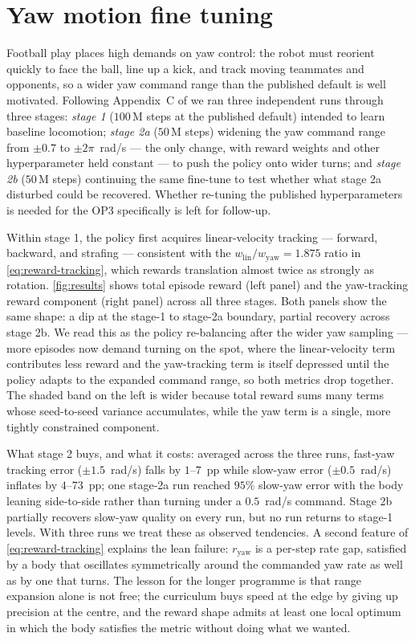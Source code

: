 \section{Yaw motion fine tuning}

Football play places high demands on yaw control: the robot must reorient
quickly to face the ball, line up a kick, and track moving teammates and
opponents, so a wider yaw command range than the published default is well
motivated. Following Appendix~C of
\citet{Zakka2025-demonstrating-mujoco-playground} we ran three independent runs
through three stages: \textit{stage 1} ($100$\,M steps at the published default)
intended to learn baseline locomotion; \textit{stage 2a} ($50$\,M steps)
widening the yaw command range from $\pm 0.7$ to $\pm 2\pi$~rad/s — the only
change, with reward weights and other hyperparameter held constant — to
push the policy onto wider turns; and \textit{stage 2b} ($50$\,M steps)
continuing the same fine-tune to test whether what stage 2a disturbed could be
recovered. Whether re-tuning the published hyperparameters is needed for the OP3
specifically is left for follow-up.

Within stage 1, the policy first acquires linear-velocity tracking — forward, backward, and strafing — consistent with the $w_{\text{lin}}/w_{\text{yaw}} = 1.875$ ratio in \autoref{eq:reward-tracking}, which rewards translation almost twice as strongly as rotation. \autoref{fig:results} shows total episode reward (left panel) and the yaw-tracking reward component (right panel) across all three stages. Both panels show the same shape: a dip at the stage-1 to stage-2a boundary, partial recovery across stage 2b. We read this as the policy re-balancing after the wider yaw sampling — more episodes now demand turning on the spot, where the linear-velocity term contributes less reward and the yaw-tracking term is itself depressed until the policy adapts to the expanded command range, so both metrics drop together. The shaded band on the left is wider because total reward sums many terms whose seed-to-seed variance accumulates, while the yaw term is a single, more tightly constrained component.

What stage 2 buys, and what it costs: averaged across the three runs, fast-yaw tracking error ($\pm 1.5$~rad/s) falls by $1$--$7$~pp while slow-yaw error ($\pm 0.5$~rad/s) inflates by $4$--$73$~pp; one stage-2a run reached $95\%$ slow-yaw error with the body leaning side-to-side rather than turning under a $0.5$~rad/s command. Stage 2b partially recovers slow-yaw quality on every run, but no run returns to stage-1 levels. With three runs we treat these as observed tendencies. A second feature of \autoref{eq:reward-tracking} explains the lean failure: $r_{\text{yaw}}$ is a per-step rate gap, satisfied by a body that oscillates symmetrically around the commanded yaw rate as well as by one that turns. The lesson for the longer programme is that range expansion alone is not free; the curriculum buys speed at the edge by giving up precision at the centre, and the reward shape admits at least one local optimum in which the body satisfies the metric without doing what we wanted.

